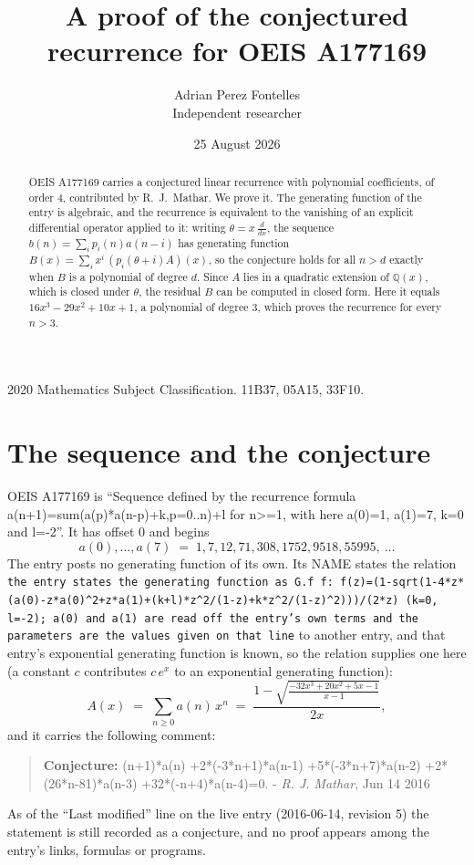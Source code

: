 \documentclass[11pt,a4paper]{article}
\title{A proof of the conjectured recurrence for OEIS A177169}
\author{Adrian Perez Fontelles\\ \small Independent researcher}
\date{25 August 2026}
\theoremstyle{plain}
\theoremstyle{definition}
\begin{document}
\maketitle

\begin{abstract}
OEIS A177169 carries a conjectured linear recurrence with polynomial coefficients, of
order 4, contributed by R.~J.~Mathar. We prove it. The generating function of the
entry is algebraic, and the recurrence is equivalent to the vanishing of an explicit
differential operator applied to it: writing $\theta=x\,\frac{d}{dx}$, the sequence
$b(n)=\sum_{i}p_{i}(n)a(n-i)$ has generating function
$B(x)=\sum_{i}x^{i}\,(p_{i}(\theta+i)A)(x)$, so the conjecture holds for all $n>d$ exactly
when $B$ is a polynomial of degree $d$. Since $A$ lies in a quadratic extension of
$\mathbb{Q}(x)$, which is closed under $\theta$, the residual $B$ can be computed in
closed form. Here it equals $16 x^{3} - 29 x^{2} + 10 x + 1$, a polynomial of degree $3$, which proves
the recurrence for every $n>3$.
\end{abstract}

\noindent\small 2020 Mathematics Subject Classification. 11B37, 05A15, 33F10.\normalsize

\section{The sequence and the conjecture}

OEIS A177169 is ``Sequence defined by the recurrence formula a(n+1)=sum(a(p)*a(n-p)+k,p=0..n)+l for n>=1, with here a(0)=1, a(1)=7, k=0 and l=-2''. It has offset $0$ and begins
\[
a(0),\dots,a(7)\;=\;1, 7, 12, 71, 308, 1752, 9518, 55995,\ \dots
\]
The entry posts no generating function of its own. Its NAME states the
relation \texttt{the entry states the generating function as G.f f: f(z)=(1-sqrt(1-4*z*(a(0)-z*a(0)\textasciicircum{}2+z*a(1)+(k+l)*z\textasciicircum{}2/(1-z)+k*z\textasciicircum{}2/(1-z)\textasciicircum{}2)))/(2*z) (k=0, l=-2); a(0) and a(1) are read off the entry's own terms and the parameters are the values given on that line} to another entry, and that entry's exponential generating
function is known, so the relation supplies one here (a constant $c$ contributes
$c\,e^{x}$ to an exponential generating function):
\begin{equation}\label{eq:gf}
A(x)\;=\;\sum_{n\ge 0} a(n)\,x^{n}\;=\;\frac{1 - \sqrt{\frac{- 32 x^{3} + 20 x^{2} + 5 x - 1}{x - 1}}}{2 x} ,
\end{equation}
and it carries the following comment:
\begin{quote}\small
\textbf{Conjecture:} (n+1)*a(n) +2*(-3*n+1)*a(n-1) +5*(-3*n+7)*a(n-2) +2*(26*n-81)*a(n-3) +32*(-n+4)*a(n-4)=0. - \emph{R. J. Mathar}, Jun 14 2016
\end{quote}
As of the ``Last modified'' line on the live entry (2016-06-14, revision 5) the
statement is still recorded as a conjecture, and no proof appears among the entry's links,
formulas or programs.
\end{document}
